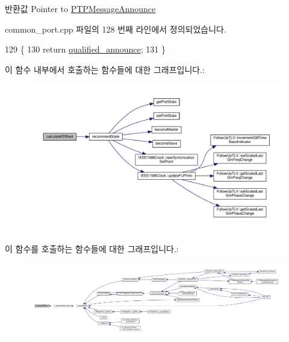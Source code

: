\begin{DoxyReturn}{반환값}
Pointer to \hyperlink{class_p_t_p_message_announce}{P\+T\+P\+Message\+Announce} 
\end{DoxyReturn}


common\+\_\+port.\+cpp 파일의 128 번째 라인에서 정의되었습니다.


\begin{DoxyCode}
129 \{
130     \textcolor{keywordflow}{return} \hyperlink{class_common_port_a32df5c4c87158c487f93549c6b752418}{qualified\_announce};
131 \}
\end{DoxyCode}


이 함수 내부에서 호출하는 함수들에 대한 그래프입니다.\+:
\nopagebreak
\begin{figure}[H]
\begin{center}
\leavevmode
\includegraphics[width=350pt]{class_common_port_a6951410ed8e6a5ef44a028ef0a50cdeb_cgraph}
\end{center}
\end{figure}




이 함수를 호출하는 함수들에 대한 그래프입니다.\+:
\nopagebreak
\begin{figure}[H]
\begin{center}
\leavevmode
\includegraphics[width=350pt]{class_common_port_a6951410ed8e6a5ef44a028ef0a50cdeb_icgraph}
\end{center}
\end{figure}


